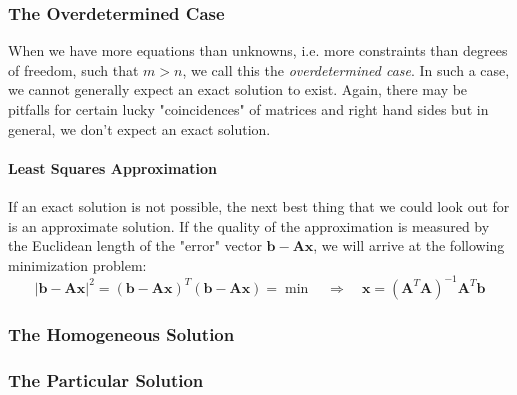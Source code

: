 \subsubsection{The Overdetermined Case}
When we have more equations than unknowns, i.e. more constraints than degrees of freedom, such that $m > n$, we call this the \emph{overdetermined case}. In such a case, we cannot generally expect an exact solution to exist. Again, there may be pitfalls for certain lucky "coincidences" of matrices and right hand sides but in general, we don't expect an exact solution.

\paragraph{Least Squares Approximation}
If an exact solution is not possible, the next best thing that we could look out for is an approximate solution. If the quality of the approximation is measured by the Euclidean length of the "error" vector $\mathbf{b} - \mathbf{A x}$, we will arrive at the following minimization problem:
\begin{equation}
|\mathbf{b} - \mathbf{A x}|^2 = (\mathbf{b} - \mathbf{A x})^T (\mathbf{b} - \mathbf{A x}) = \min
\quad \Rightarrow \quad
\boxed{ \mathbf{x} = (\mathbf{A}^T \mathbf{A})^{-1} \mathbf{A}^T \mathbf{b} }
\end{equation}






\subsubsection{The Homogeneous Solution}


\subsubsection{The Particular Solution}


